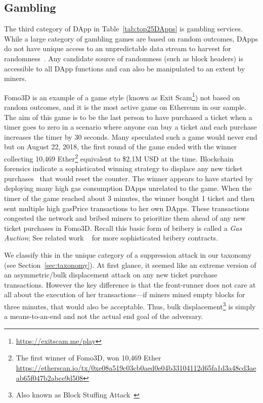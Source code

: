 
\subsection{Gambling}
\label{sec:gambling}

The third category of DApp in Table~\ref{tab:top25DApps} is gambling services. While a large category of gambling games are based on random outcomes, DApps do not have unique access to an unpredictable data stream to harvest for randomness~\cite{pierrot2018malleability}. Any candidate source of randomness (such as block headers) is accessible to all DApp functions and can also be manipulated to an extent by miners.

\textsf{Fomo3D} is an example of a game style (known as \textsf{Exit Scam}\footnote{\url{https://exitscam.me/play}}) not based on random outcomes, and it is the most active game on Ethereum in our sample. The aim of this game is to be the last person to have purchased a ticket when a timer goes to zero in a scenario where anyone can buy a ticket and each purchase increases the timer by 30 seconds. Many speculated such a game would never end but on August 22, 2018, the first round of the game ended with the winner collecting 10,469 Ether\footnote{The first winner of Fomo3D, won 10,469 Ether \url{ https://etherscan.io/tx/0xe08a519c03cb0aed0e04b33104112d65fa1d3a48cd3aeab65f047b2abce9d508}} equivalent to \$2.1M USD at the time.
Blockchain forensics indicate a sophisticated winning strategy to displace any new ticket purchases~\cite{fomo3dhacker} that would reset the counter. The winner appears to have started by deploying many high gas consumption DApps unrelated to the game. When the timer of the game reached about 3 minutes, the winner bought 1 ticket and then sent multiple high gasPrice transactions to her own DApps. These transactions congested the network and bribed miners to prioritize them ahead of any new ticket purchases in \textsf{Fomo3D}. Recall this basic form of bribery is called a \textit{Gas Auction}; See related work ~\cite{mccorry2018smart,bonneau2016buy} for more sophisticated bribery contracts. 

We classify this in the unique category of a suppression attack in our taxonomy (see Section~\ref{sec:taxonomy}). At first glance, it seemed like an extreme version of an asymmetric/bulk displacement attack on any new ticket purchase transactions. However the key difference is that the front-runner does not care at all about the execution of her transactions---if miners mined empty blocks for three minutes, that would also be acceptable. Thus, bulk displacement\footnote{Also known as Block Stuffing Attack~\cite{blockstuffing18}} is simply a means-to-an-end and not the actual end goal of the adversary.

